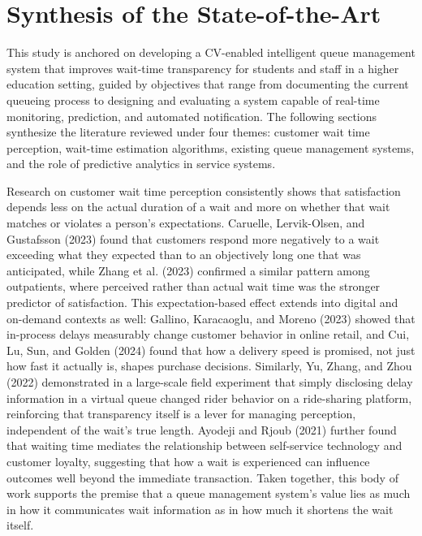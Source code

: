 \documentclass{research}
\begin{document}
\section{Synthesis of the State-of-the-Art }
This study is anchored on developing a CV-enabled intelligent queue management system that improves wait-time transparency for students and staff in a higher education setting, guided by objectives that range from documenting the current queueing process to designing and evaluating a system capable of real-time monitoring, prediction, and automated notification. The following sections synthesize the literature reviewed under four themes: customer wait time perception, wait-time estimation algorithms, existing queue management systems, and the role of predictive analytics in service systems.

Research on customer wait time perception consistently shows that satisfaction depends less on the actual duration of a wait and more on whether that wait matches or violates a person's expectations. Caruelle, Lervik-Olsen, and Gustafsson (2023) found that customers respond more negatively to a wait exceeding what they expected than to an objectively long one that was anticipated, while Zhang et al. (2023) confirmed a similar pattern among outpatients, where perceived rather than actual wait time was the stronger predictor of satisfaction. This expectation-based effect extends into digital and on-demand contexts as well: Gallino, Karacaoglu, and Moreno (2023) showed that in-process delays measurably change customer behavior in online retail, and Cui, Lu, Sun, and Golden (2024) found that how a delivery speed is promised, not just how fast it actually is, shapes purchase decisions. Similarly, Yu, Zhang, and Zhou (2022) demonstrated in a large-scale field experiment that simply disclosing delay information in a virtual queue changed rider behavior on a ride-sharing platform, reinforcing that transparency itself is a lever for managing perception, independent of the wait's true length. Ayodeji and Rjoub (2021) further found that waiting time mediates the relationship between self-service technology and customer loyalty, suggesting that how a wait is experienced can influence outcomes well beyond the immediate transaction. Taken together, this body of work supports the premise that a queue management system's value lies as much in how it communicates wait information as in how much it shortens the wait itself.
\end{document}

